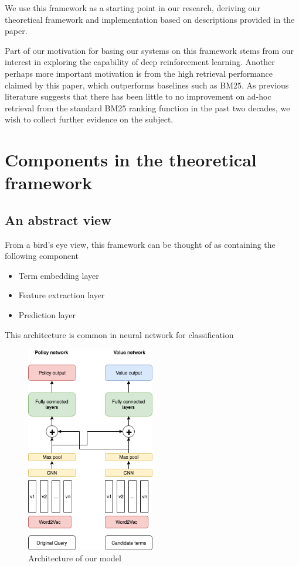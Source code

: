 We use this framework as a starting point in our research, deriving our theoretical framework and implementation based on descriptions provided in the paper. 

Part of our motivation for basing our systems on this framework stems from our interest in exploring the capability of deep reinforcement learning. Another perhaps more important motivation is from the high retrieval performance claimed by this paper, which outperforms baselines such as BM25. As previous literature suggests that there has been little to no improvement on ad-hoc retrieval from the standard BM25 ranking function in the past two decades, we wish to collect further evidence on the subject. 






\section{Components in the theoretical framework}

\subsection{An abstract view}

From a bird's eye view, this framework can be thought of as containing the following component

\begin{itemize}
    \item Term embedding layer
    \item Feature extraction layer 
    \item Prediction layer
\end{itemize}

This architecture is common in neural network for classification



\begin{figure}
  \centering
    \includegraphics[width=0.5\textwidth]{twonetwork.png}
  \caption{Architecture of our model}
    \label{fig:twonetwork}

\end{figure}

